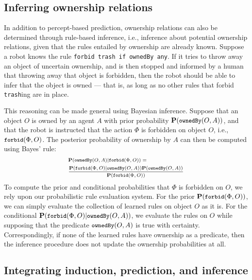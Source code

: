 \documentclass[letterpaper]{article} %
\begin{document}
\subsection{Inferring ownership relations}

In addition to percept-based prediction, ownership relations can also be determined through rule-based inference, i.e., inference about potential ownership relations, given that the rules entailed by ownership are already known. Suppose a robot knows the rule \texttt{\small{forbid trash if ownedBy any}}. If it tries to throw away an object of uncertain ownership, and is then stopped and informed by a human that throwing away that object is forbidden, then the robot should be able to infer that the object is owned --- that is, as long as no other rules that forbid \texttt{\small{trash}}ing are in place.

This reasoning can be made general using Bayesian inference. Suppose that an object $O$ is owned by an agent $A$ with prior probability $\small{\mathbf{P}(\texttt{ownedBy}(O,A))}$, and that the robot is instructed that the action $\Phi$ is forbidden on object $O$, i.e., $\small{\texttt{forbid}(\Phi,O)}$. The posterior probability of ownership by $A$ can then be computed using Bayes' rule:
\begin{equation}
\begin{scriptsize}
\begin{aligned}
    &\mathbf{P}(\texttt{ownedBy}(O,A)|\texttt{forbid}(\Phi,O)) = \\
    &\frac{\mathbf{P}(\texttt{forbid}(\Phi,O)|\texttt{ownedBy}(O,A))\mathbf{P}(\texttt{ownedBy}(O,A))}{\mathbf{P}(\texttt{forbid}(\Phi,O))}
    \label{eq:RuleBasedInference}
\end{aligned}
\end{scriptsize}
\end{equation}
To compute the prior and conditional probabilities that $\Phi$ is forbidden on $O$, we rely upon our probabilistic rule evaluation system. For the prior $\small\mathbf{P}(\texttt{forbid}(\Phi,O))$, we can simply evaluate the collection of learned rules on object $O$ as it is. For the conditional $\small\mathbf{P}(\texttt{forbid}(\Phi,O)|\texttt{ownedBy}(O,A))$, we evaluate the rules on $O$ while supposing that the predicate $\small\texttt{ownedBy}(O,A)$ is true with certainty. Correspondingly, if none of the learned rules have ownership as a predicate, then the inference procedure does not update the ownership probabilities at all.

\subsection{Integrating induction, prediction, and inference}
\end{document}
